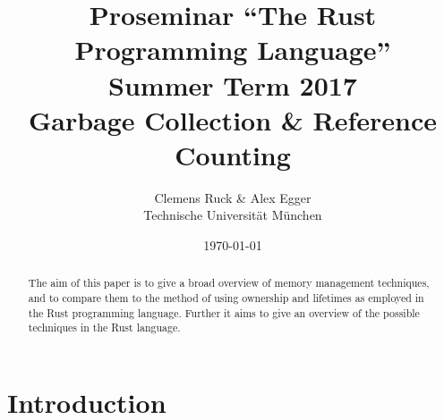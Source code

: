 \documentclass[twocolumn]{article}
\author{Clemens Ruck \& Alex Egger\\ Technische Universit\"at M\"unchen}
\title{Proseminar ``The Rust Programming Language'' \\
       Summer Term 2017\\
       {\bf Garbage Collection \& Reference Counting}
}
\date{\today}
\begin{document}
\maketitle

\begin{abstract}
The aim of this paper is to give a broad overview of memory management techniques, and to compare them
to the method of using ownership and lifetimes as employed in the Rust programming language.
Further it aims to give an overview of the possible techniques in the Rust language.
\end{abstract}

\section{Introduction}

\label{introduction}
\end{document}
